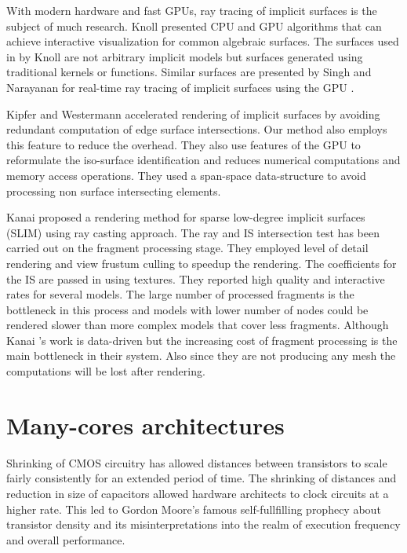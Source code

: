 With modern hardware and fast GPUs, ray tracing of implicit surfaces is the subject of much research. Knoll \etal \cite{Knoll2009} presented 
CPU and GPU algorithms that can achieve interactive visualization for common algebraic surfaces. The surfaces used in by Knoll \etal are not 
arbitrary implicit models but surfaces generated using traditional kernels or functions. Similar surfaces are presented by Singh and Narayanan
for real-time ray tracing of implicit surfaces using the GPU \cite{singh2010real}. 


Kipfer and Westermann \cite{Kipfer2005} accelerated rendering of implicit surfaces by avoiding redundant computation of edge surface intersections. 
Our method also employs this feature to reduce the overhead. They also use features of the GPU to reformulate the iso-surface identification and reduces 
numerical computations and memory access operations. They used a span-space data-structure to avoid processing non surface intersecting elements.

Kanai \etal \cite{Kanai2006a} proposed a rendering method for sparse low-degree implicit surfaces (SLIM) using ray casting approach. The ray and IS intersection
test has been carried out on the fragment processing stage. They employed level of detail rendering and view frustum culling to speedup the rendering. 
The coefficients for the IS are passed in using textures. They reported high quality and interactive rates for several models. The large number of processed
fragments is the bottleneck in this process and models with lower number of nodes could be rendered slower than more complex models that cover less fragments.
Although Kanai \etal's work is data-driven but the increasing cost of fragment processing is the main bottleneck in their system. Also since they are not
producing any mesh the computations will be lost after rendering.



\section{Many-cores architectures}
Shrinking of CMOS circuitry has allowed distances between transistors to scale fairly consistently for an extended period of time. The shrinking 
of distances and reduction in size of capacitors allowed hardware architects to clock circuits at a higher rate. This led to Gordon Moore's
famous self-fullfilling prophecy about transistor density and its misinterpretations into the realm of execution frequency and overall performance.

